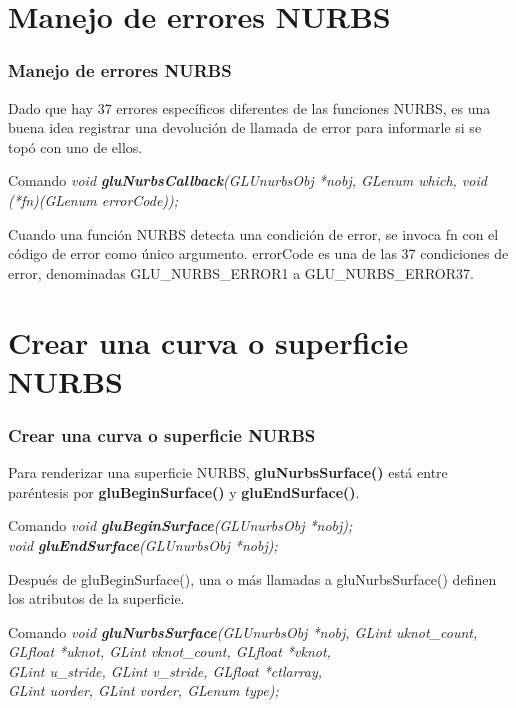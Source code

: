 \documentclass[10.5pt]{beamer}
\begin{document}

\section{Manejo de errores NURBS}
\begin{frame}[fragile]
\frametitle{Manejo de errores NURBS}
\small
Dado que hay 37 errores específicos diferentes de las funciones NURBS,
es una buena idea registrar una devolución de llamada de error para
informarle si se topó con uno de ellos.

\begin{alertblock}{Comando}
    \small
    \emph{void \textbf{gluNurbsCallback}(GLUnurbsObj *nobj, GLenum which,
void (*fn)(GLenum errorCode));}
\end{alertblock}

Cuando una función NURBS detecta una condición de error, se invoca fn con el código de error como único argumento. errorCode es una de las 37 condiciones de error, denominadas GLU\_NURBS\_ERROR1 a GLU\_NURBS\_ERROR37.

\end{frame}


\section{Crear una curva o superficie NURBS}
\begin{frame}[fragile]
\frametitle{Crear una curva o superficie NURBS}
\small
Para renderizar una superficie NURBS, \textbf{gluNurbsSurface()}
está entre paréntesis por \textbf{gluBeginSurface()} y
\textbf{gluEndSurface()}.

\begin{alertblock}{Comando}
    \small
    \emph{void \textbf{gluBeginSurface}(GLUnurbsObj *nobj);}\\
    \emph{void \textbf{gluEndSurface}(GLUnurbsObj *nobj);}
\end{alertblock}

Después de gluBeginSurface(), una o más
llamadas a gluNurbsSurface() definen los atributos de
la superficie.

\begin{alertblock}{Comando}
    \small
    \emph{void \textbf{gluNurbsSurface}(GLUnurbsObj *nobj, GLint uknot\_count,\\
    GLfloat *uknot, GLint vknot\_count, GLfloat *vknot,\\
    GLint u\_stride, GLint v\_stride, GLfloat *ctlarray,\\
    GLint uorder, GLint vorder, GLenum type);}
\end{alertblock}

\end{frame}
\end{document}
